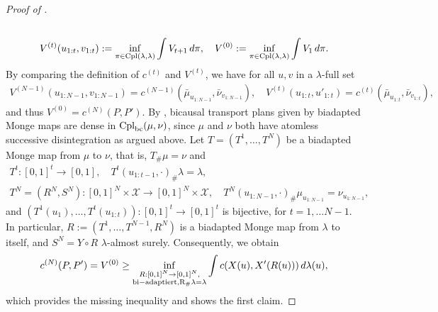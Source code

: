 \documentclass[a4paper]{amsart}
\numberwithin{theorem}{section}
\theoremstyle{definition}
\newcommand{\cpl}{\textup{Cpl}}
\begin{document}
\begin{proof}[Proof of ]
\begin{gather*}
        \\
        V^{(t)}(u_{1:t},v_{1:t}) := \inf_{\pi \in \cpl(\lambda,\lambda)} \int V_{t + 1 } \, d\pi, \quad
        V^{(0)} := \inf_{\pi \in \cpl(\lambda,\lambda)} \int V_1 \, d\pi.
    \end{gather*}
    By comparing the definition of $c^{(t)}$ and $V^{(t)}$, we have for all $u,v$ in a $\lambda$-full set
    \begin{align*}
        V^{(N-1)}(u_{1:N-1},v_{1:N-1}) = c^{(N-1)}(\bar \mu_{u_{1:N-1}},\bar \nu_{v_{1:N-1}}), \quad
        V^{(t)}(u_{1:t},u'_{1:t}) = c^{(t)}(\bar \mu_{u_{1:t}},\bar \nu_{v_{1:t}}),
    \end{align*}
    and thus $V^{(0)} = c^{(N)}(P,P')$.
    By \cite{BePaSc21c}, bicausal transport plans given by biadapted Monge maps are dense in $\cpl_{\rm bc}(\mu,\nu)$, since $\mu$ and $\nu$ both have atomless successive disintegration as argued above.
    Let $T = (T^1,\dots,T^N)$ be a biadapted Monge map from $\mu$ to $\nu$, that is, $T_\# \mu = \nu$ and
    \begin{gather*}
        T^t : [0,1]^t \to [0,1],  \quad T^t(u_{1:t-1},\cdot)_\# \lambda = \lambda, \\
        T^N = (R^N,S^N) : [0,1]^N \times \mathcal X \to [0,1]^N \times \mathcal X, \quad T^N(u_{1:N-1},\cdot)_\# \mu_{u_{1:N-1}} = \nu_{u_{1:N-1}},
    \end{gather*}
    and $(T^1(u_1), \dots, T^t(u_{1:t})) : [0,1]^t \to [0,1]^t$ is bijective, for $t = 1,\dots N-1$.
    In particular, $R := (T^1,\dots,T^{N-1},R^N)$ is a biadapted Monge map from $\lambda$ to itself, and $S^N = Y \circ R$ $\lambda$-almost surely.
    Consequently, we obtain
    \[
        c^{(N)}(P,P') = V^{(0)} \ge \inf_{ \substack{ R : [0,1]^N \to [0,1]^N, \\ {\rm bi-adaptiert, R_\#\lambda=\lambda} } } \int c(X(u),X'(R(u))) \, d\lambda(u),
    \]
    which provides the missing inequality and shows the first claim.
\end{proof}






\end{document}
